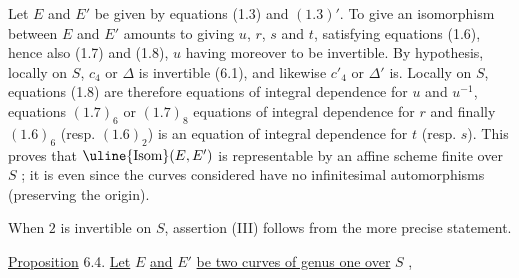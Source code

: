 Let $E$ and $E'$ be given by equations (1.3) and $(1.3)'$. To give an isomorphism between $E$ and $E'$ amounts to giving $u$, $r$, $s$ and $t$, satisfying equations (1.6), hence also (1.7) and (1.8), $u$ having moreover to be invertible. By hypothesis, locally on $S$, $c_4$ or $\Delta$ is invertible (6.1), and likewise $c'_4$ or $\Delta'$ is. Locally on $S$, equations (1.8) are therefore equations of integral dependence for $u$ and $u^{-1}$, equations $(1.7)_6$ or $(1.7)_8$ equations of integral dependence for $r$ and finally $(1.6)_6$ (resp. $(1.6)_2$) is an equation of integral dependence for $t$ (resp. $s$). This proves that $\text{\uline{Isom}}(E,E')$ is representable by an affine scheme finite over $S$ ; it is even  since the curves considered have no infinitesimal automorphisms (preserving the origin).

When $2$ is invertible on $S$, assertion (III) follows from the more precise statement.

\uline{Proposition} 6.4. \quad \uline{Let} $E$ \uline{and} $E'$ \uline{be two curves of genus one over} $S$ ,%

